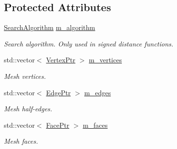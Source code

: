 \subsection*{Protected Attributes}
\begin{DoxyCompactItemize}
\item 
\mbox{\label{classDcel_1_1MeshT_aaa5bdf8df02aa8bcff84203467f86fbe}} 
\hyperlink{classDcel_1_1MeshT_abb4c3bb7a52804bb041c133f30151399}{Search\+Algorithm} \hyperlink{classDcel_1_1MeshT_aaa5bdf8df02aa8bcff84203467f86fbe}{m\+\_\+algorithm}
\begin{DoxyCompactList}\small\item\em Search algorithm. Only used in signed distance functions. \end{DoxyCompactList}\item 
\mbox{\label{classDcel_1_1MeshT_a4263fd9ebba22b96e12ee9f046eca089}} 
std\+::vector$<$ \hyperlink{classDcel_1_1MeshT_a1e0abeadcb51e679b0dd9a36e2ee08c7}{Vertex\+Ptr} $>$ \hyperlink{classDcel_1_1MeshT_a4263fd9ebba22b96e12ee9f046eca089}{m\+\_\+vertices}
\begin{DoxyCompactList}\small\item\em Mesh vertices. \end{DoxyCompactList}\item 
\mbox{\label{classDcel_1_1MeshT_a3325cb09037fa32255aa1a8a5536e473}} 
std\+::vector$<$ \hyperlink{classDcel_1_1MeshT_ab2b035530536a8bc56e40aab455f24e3}{Edge\+Ptr} $>$ \hyperlink{classDcel_1_1MeshT_a3325cb09037fa32255aa1a8a5536e473}{m\+\_\+edges}
\begin{DoxyCompactList}\small\item\em Mesh half-\/edges. \end{DoxyCompactList}\item 
\mbox{\label{classDcel_1_1MeshT_a17e08b2ee4b5b7b1dc3df974e792ca5f}} 
std\+::vector$<$ \hyperlink{classDcel_1_1MeshT_a6c71642a9e6b36f9d6ab6027035625f0}{Face\+Ptr} $>$ \hyperlink{classDcel_1_1MeshT_a17e08b2ee4b5b7b1dc3df974e792ca5f}{m\+\_\+faces}
\begin{DoxyCompactList}\small\item\em Mesh faces. \end{DoxyCompactList}\end{DoxyCompactItemize}


